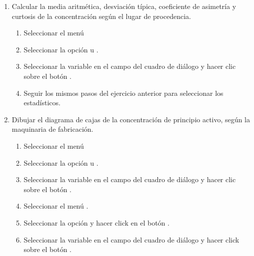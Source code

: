 \begin{enumerate}[leftmargin=*]
\begin{enumerate}
\item Calcular la media aritmética, desviación típica, coeficiente
de asimetría y curtosis de la concentración según el lugar de
procedencia.

\begin{indicacion}
\begin{enumerate}
\item Seleccionar el menú  
\item Seleccionar la opción  u .

\item Seleccionar la variable  en el campo  del cuadro de diálogo y
hacer clic sobre el botón . 
\item Seguir los mismos pasos del ejercicio anterior para seleccionar los estadísticos.
\end{enumerate}
\end{indicacion}

\item Dibujar el diagrama de cajas de la concentración de principio activo, según la maquinaria de fabricación.
\begin{indicacion}
\begin{enumerate}
\item Seleccionar el menú  
\item Seleccionar la opción  u .
\item Seleccionar la variable  en el campo  del cuadro de diálogo y
hacer clic sobre el botón .
\item Seleccionar el menú .
\item Seleccionar la opción  y hacer click en el botón . 
\item Seleccionar la variable  en el campo  del cuadro de diálogo
y hacer click sobre el botón .
\end{enumerate}
\end{indicacion}
\end{enumerate}
\end{enumerate}


